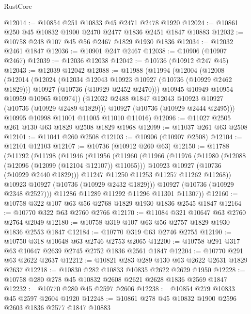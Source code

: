 \begin{lexlean}{RustCore}
\begin{coremodule}
@12014 := @10854 @251 @10833 @45 @2471 @2478 @1920
@12024 := @10861 @250 @45 @10832 @1900 @2470 @2477 @1836 @2451 @1847 @10883
@12032 := @10758 @248 @107 @45 @56 @2467 @1829 @1930 @1836
@12034 := @12032 @2461 @1847
@12036 := @10901 @247 @2467
@12038 := @10906 (@10907 @2467)
@12039 := @12036 @12038
@12042 := @10736 (@10912 @247 @45)
@12043 := @12039 @12042
@12088 := @11988
    (@11994
      (@12004
        (@12008
          (@12014
            (@12024
              (@12034 @12043 @10923 @10927 (@10736 (@10929 @2462 @1829)))
              @10927
              (@10736 (@10929 @2452 @2470)))
            @10945
            @10949
            @10954
            @10959
            @10965
            @10974))
        (@12032 @2488 @1847 @12043 @10923 @10927 (@10736 (@10929 @2489 @1829)))
        @10927
        (@10736 (@10929 @2444 @2495)))
      @10995
      @10998
      @11001
      @11005
      @11010
      @11016)
@12096 := @11027 @2505 @261 @130 @63 @1829 @2508 @1829 @1968
@12099 := @11037 @261 @63 @2508
@12101 := @11041 @260 @2508
@12103 := @10906 (@10907 @2508)
@12104 := @12101 @12103
@12107 := @10736 (@10912 @260 @63)
@12150 := @11788
    (@11792
      (@11798
        (@11946
          (@11956
            (@11960
              (@11966
                (@11976
                  (@11980 (@12088 (@12096 (@12099 (@12104 @12107)) @11065)))
                  @10923
                  @10927
                  (@10736 (@10929 @2440 @1829)))
                @11247
                @11250
                @11253
                @11257
                @11262
                @11268))
            @10923
            @10927
            (@10736 (@10929 @2432 @1829)))
          @10927
          (@10736 (@10929 @2348 @2527)))
        @11286
        @11289
        @11292
        @11296
        @11301
        @11307))
@12160 := @10758 @322 @107 @63 @56 @2768 @1829 @1930 @1836 @2545 @1847
@12164 := @10770 @322 @63 @2760 @2766
@12170 := @11084 @321 @10647 @63 @2760 @2764 @2049
@12180 := @10758 @319 @107 @63 @56 @2757 @1829 @1930 @1836 @2553 @1847
@12184 := @10770 @319 @63 @2746 @2755
@12190 := @10750 @318 @10648 @63 @2746 @2753 @2065
@12200 := @10758 @291 @317 @63 @10647 @2639 @2745 @2752 @1836 @2561 @1847
@12204 := @10770 @291 @63 @2622 @2637
@12212 := @10821 @283 @289 @130 @63 @2622 @2631 @1829 @2637
@12218 := @10830 @282 @10833 @10835 @2622 @2629 @1950
@12228 := @10758 @280 @278 @45 @10832 @2608 @2621 @2628 @1836 @2569 @1847
@12232 := @10770 @280 @45 @2597 @2606
@12238 := @10854 @279 @10833 @45 @2597 @2604 @1920
@12248 := @10861 @278 @45 @10832 @1900 @2596 @2603 @1836 @2577 @1847 @10883

\end{coremodule}
\end{lexlean}
